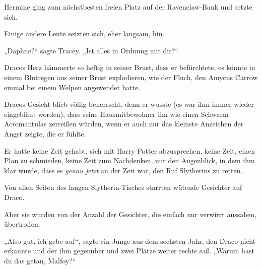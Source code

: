 Hermine ging zum nächstbesten freien Platz auf der Ravenclaw-Bank und setzte sich.

Einige andere Leute setzten sich, eher langsam, hin.

„Daphne?“ sagte Tracey.
„Ist alles in Ordnung mit dir?“

\later

Dracos Herz hämmerte so heftig in seiner Brust, dass er befürchtete, es könnte in einem Blutregen aus seiner Brust explodieren, wie der Fluch, den Amycus Carrow einmal bei einem Welpen angewendet hatte.

Dracos Gesicht blieb völlig beherrscht, denn er wusste (es war ihm immer wieder eingebläut worden), dass seine Hausmitbewohner ihn wie einen Schwarm Acromantulas zerreißen würden, wenn er auch nur das kleinste Anzeichen der Angst zeigte, die er fühlte.

Er hatte keine Zeit gehabt, sich mit Harry Potter abzusprechen, keine Zeit, einen Plan zu schmieden, keine Zeit zum Nachdenken, nur den Augenblick, in dem ihm klar wurde, dass es \emph{genau jetzt} an der Zeit war, den Ruf Slytherins zu retten.

Von allen Seiten des langen Slytherin-Tisches starrten wütende Gesichter auf Draco.

Aber sie wurden von der Anzahl der Gesichter, die einfach nur verwirrt aussahen, übertroffen.

„Also gut, ich gebe auf“, sagte ein Junge aus dem sechsten Jahr, den Draco nicht erkannte und der ihm gegenüber und zwei Plätze weiter rechts saß.
„Warum hast du das getan, Malfoy?“

